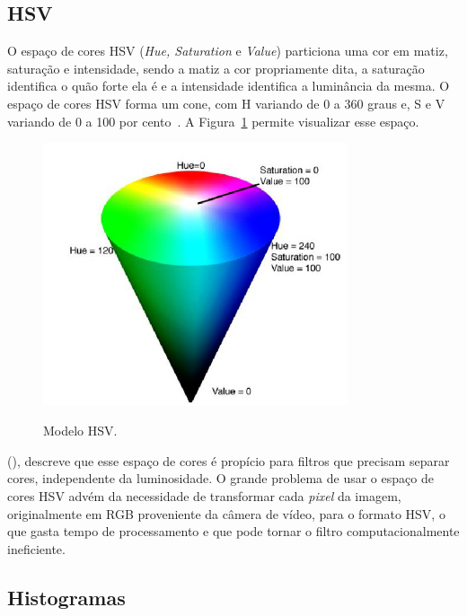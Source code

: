 \subsection{HSV}
\label{subsec:hsv}

O espaço de cores HSV (\textit{Hue, Saturation} e \textit{Value}) particiona uma cor em matiz, saturação e intensidade, sendo a matiz a cor propriamente dita, a saturação identifica o quão forte ela é e a intensidade identifica a luminância da mesma. O espaço de cores HSV forma um cone, com H variando de 0 a 360 graus e, S e V variando de 0 a 100 por cento~\cite{penharbel2004filtro}. A Figura~\ref{fig:modeloHSV} permite visualizar esse espaço.

\begin{figure}[!hbtp]
  \centering
   \caption{Modelo HSV.}
    \includegraphics[width = 0.8\textwidth]{Caps/Figs/ref-teorico/modelo-HSV.png}
   \label{fig:modeloHSV}
\end{figure}

\citeauthor{penharbel2004filtro} (\citeyear{penharbel2004filtro}), descreve que esse espaço de cores é propício para filtros que precisam separar cores, independente da luminosidade. O grande problema de usar o espaço de cores HSV advém da necessidade de transformar cada \textit{pixel} da imagem, originalmente em RGB proveniente da câmera de vídeo, para o formato HSV, o que gasta tempo de processamento e que pode tornar o filtro computacionalmente ineficiente.

\subsection{Histogramas}
\label{subsec:histogramas}

